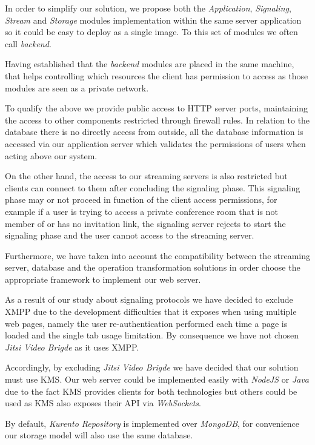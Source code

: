 In order to simplify our solution, we propose both the \emph{Application}, \emph{Signaling}, \emph{Stream} and \emph{Storage} modules implementation within the same server application so it could be easy to deploy as a single image. To this set of modules we often call \emph{backend}.

Having established that the \emph{backend} modules are placed in the same machine, that helps controlling which resources the client has permission to access as those modules are seen as a private network.

To qualify the above we provide public access to \ac{HTTP} server ports, maintaining the access to other components restricted through firewall rules. In relation to the database there is no directly access from outside, all the database information is accessed via our application server which validates the permissions of users when acting above our system.

On the other hand, the access to our streaming servers is also restricted but clients can connect to them after concluding the signaling phase. This signaling phase may or not proceed in function of the client access permissions, for example if a user is trying to access a private conference room that is not member of or has no invitation link, the signaling server rejects to start the signaling phase and the user cannot access to the streaming server.

Furthermore, we have taken into account the compatibility between the streaming server, database and the operation transformation solutions in order choose the appropriate framework to implement our web server.

As a result of our study about signaling protocols we have decided to exclude \ac{XMPP} due to the development difficulties that it exposes when using multiple web pages, namely the user re-authentication performed each time a page is loaded and the single tab usage limitation. By consequence we have not chosen \emph{Jitsi Video Brigde} as it uses \ac{XMPP}.

Accordingly, by excluding \emph{Jitsi Video Brigde} we have decided that our solution must use \ac{KMS}. Our web server could be implemented easily with \emph{NodeJS} or \emph{Java} due to the fact \ac{KMS} provides clients for both technologies but others could be used as \ac{KMS} also exposes their \ac{API} via \emph{WebSockets}.

By default, \emph{Kurento Repository} is implemented over \emph{MongoDB}, for convenience our storage model will also use the same database. 


